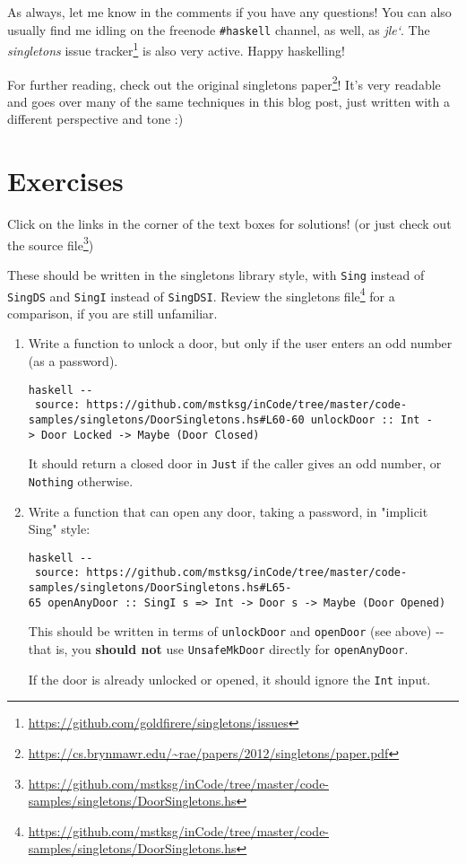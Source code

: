 \documentclass[]{article}
\renewcommand{\href}[2]{#2\footnote{\url{#1}}}
\begin{document}
As always, let me know in the comments if you have any questions! You can also
usually find me idling on the freenode \texttt{\#haskell} channel, as well, as
\emph{jle`}. The \emph{singletons}
\href{https://github.com/goldfirere/singletons/issues}{issue tracker} is also
very active. Happy haskelling!

For further reading, check out the
\href{https://cs.brynmawr.edu/~rae/papers/2012/singletons/paper.pdf}{original
singletons paper}! It's very readable and goes over many of the same techniques
in this blog post, just written with a different perspective and tone :)

\section{Exercises}

Click on the links in the corner of the text boxes for solutions! (or just check
out
\href{https://github.com/mstksg/inCode/tree/master/code-samples/singletons/DoorSingletons.hs}{the
source file})

These should be written in the singletons library style, with \texttt{Sing}
instead of \texttt{SingDS} and \texttt{SingI} instead of \texttt{SingDSI}.
Review the
\href{https://github.com/mstksg/inCode/tree/master/code-samples/singletons/DoorSingletons.hs}{singletons
file} for a comparison, if you are still unfamiliar.

\begin{enumerate}
\item
  Write a function to unlock a door, but only if the user enters an odd number
  (as a password).

  \texttt{haskell\ -\/-\ source:\ https://github.com/mstksg/inCode/tree/master/code-samples/singletons/DoorSingletons.hs\#L60-60\ unlockDoor\ ::\ Int\ -\textgreater{}\ Door\ \textquotesingle{}Locked\ -\textgreater{}\ Maybe\ (Door\ \textquotesingle{}Closed)}

  It should return a closed door in \texttt{Just} if the caller gives an odd
  number, or \texttt{Nothing} otherwise.
\item
  Write a function that can open any door, taking a password, in "implicit Sing"
  style:

  \texttt{haskell\ -\/-\ source:\ https://github.com/mstksg/inCode/tree/master/code-samples/singletons/DoorSingletons.hs\#L65-65\ openAnyDoor\ ::\ SingI\ s\ =\textgreater{}\ Int\ -\textgreater{}\ Door\ s\ -\textgreater{}\ Maybe\ (Door\ \textquotesingle{}Opened)}

  This should be written in terms of \texttt{unlockDoor} and \texttt{openDoor}
  (see above) -\/- that is, you \textbf{should not} use \texttt{UnsafeMkDoor}
  directly for \texttt{openAnyDoor}.

  If the door is already unlocked or opened, it should ignore the \texttt{Int}
  input.
\end{enumerate}
\end{document}
